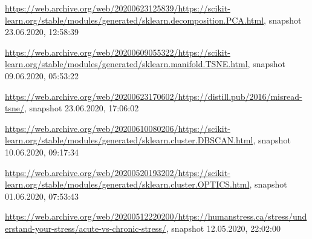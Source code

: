 \begin{appendices}
\url{https://web.archive.org/web/20200623125839/https://scikit-learn.org/stable/modules/generated/sklearn.decomposition.PCA.html}, snapshot 23.06.2020, 12:58:39

\url{https://web.archive.org/web/20200609055322/https://scikit-learn.org/stable/modules/generated/sklearn.manifold.TSNE.html}, snapshot 09.06.2020, 05:53:22

\url{https://web.archive.org/web/20200623170602/https://distill.pub/2016/misread-tsne/}, snapshot 23.06.2020, 17:06:02

\url{https://web.archive.org/web/20200610080206/https://scikit-learn.org/stable/modules/generated/sklearn.cluster.DBSCAN.html}, snapshot 10.06.2020, 09:17:34

\url{https://web.archive.org/web/20200520193202/https://scikit-learn.org/stable/modules/generated/sklearn.cluster.OPTICS.html}, snapshot 01.06.2020, 07:53:43

\url{https://web.archive.org/web/20200512220200/https://humanstress.ca/stress/understand-your-stress/acute-vs-chronic-stress/}, snapshot 12.05.2020, 22:02:00



\end{appendices}

